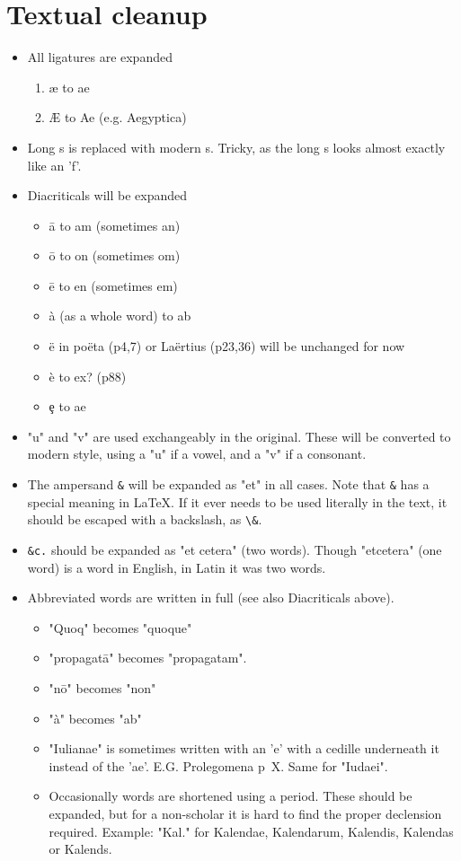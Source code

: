 \documentclass{report}
\begin{document}
\section{Textual cleanup}
\label{sec:textual_cleanup}
\begin{itemize}
\item All ligatures are expanded
	\begin{enumerate}
	\item æ to ae
	\item Æ to Ae (e.g. Aegyptica)
	\end{enumerate}

\item Long s is replaced with modern s. Tricky, as the long s looks almost
exactly like an 'f'.

\item Diacriticals will be expanded
	\begin{itemize}
	\item ā to am (sometimes an)
	\item ō to on (sometimes om)
	\item ē to en (sometimes em)
	\item à (as a whole word) to ab
	\item ë in poëta (p4,7) or Laërtius (p23,36) will be unchanged for now
	\item è to ex? (p88)
	\item ȩ to ae
	\end{itemize}

\item "u" and "v" are used exchangeably in the original.
These will be converted to modern style,
 using a "u" if a vowel, and a "v" if a consonant.

\item The ampersand \verb+&+ will be expanded as "et" in all cases.
 Note that \verb+&+ has a special meaning in \LaTeX. If it ever needs to be
 used literally in the text, it should be escaped with a backslash, as
 \verb+\&+.

\item \verb+&c.+ should be expanded as "et cetera" (two words). Though
 "etcetera" (one word) is a word in English, in Latin it was two words.

\item Abbreviated words are written in full
 (see also Diacriticals above).
	\begin{itemize}
	\item "Quoq" becomes "quoque"
	\item "propagatā" becomes "propagatam".
	\item "nō" becomes "non"
	\item "à" becomes "ab"
	\item "Iulianae" is sometimes written with an 'e' with a cedille underneath
	 it instead of the 'ae'. E.G. Prolegomena p~X.
	 Same for "Iudaei".
	\item Occasionally words are shortened using a period. These should be
	expanded, but for a non-scholar it is hard to find the proper declension
	required.
	Example: "Kal." for Kalendae, Kalendarum, Kalendis, Kalendas or Kalends.
	\end{itemize}


\end{itemize}
\end{document}
